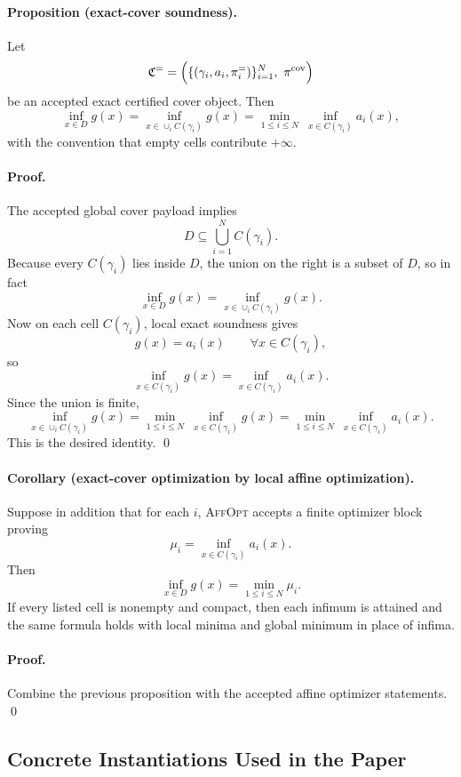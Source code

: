 \paragraph{Proposition (exact-cover soundness).}
Let
\[
\mathfrak C^{=}
=
\Bigl(\{(\gamma_i,a_i,\pi_i^{=})\}_{i=1}^N,\ \pi^{\mathrm{cov}}\Bigr)
\]
be an accepted exact certified cover object. Then
\[
\inf_{x\in D} g(x)
=
\inf_{x\in \cup_i C(\gamma_i)} g(x)
=
\min_{1\le i\le N}\ \inf_{x\in C(\gamma_i)} a_i(x),
\]
with the convention that empty cells contribute $+\infty$.

\paragraph{Proof.}
The accepted global cover payload implies
\[
D\subseteq \bigcup_{i=1}^N C(\gamma_i).
\]
Because every $C(\gamma_i)$ lies inside $D$, the union on the right is a subset of $D$, so in fact
\[
\inf_{x\in D} g(x)
=
\inf_{x\in \cup_i C(\gamma_i)} g(x).
\]
Now on each cell $C(\gamma_i)$, local exact soundness gives
\[
g(x)=a_i(x)
\qquad \forall x\in C(\gamma_i),
\]
so
\[
\inf_{x\in C(\gamma_i)} g(x)
=
\inf_{x\in C(\gamma_i)} a_i(x).
\]
Since the union is finite,
\[
\inf_{x\in \cup_i C(\gamma_i)} g(x)
=
\min_{1\le i\le N}\ \inf_{x\in C(\gamma_i)} g(x)
=
\min_{1\le i\le N}\ \inf_{x\in C(\gamma_i)} a_i(x).
\]
This is the desired identity. \qed

\paragraph{Corollary (exact-cover optimization by local affine optimization).}
Suppose in addition that for each $i$, \textsc{AffOpt} accepts a finite optimizer block proving
\[
\mu_i = \inf_{x\in C(\gamma_i)} a_i(x).
\]
Then
\[
\inf_{x\in D} g(x)=\min_{1\le i\le N}\mu_i.
\]
If every listed cell is nonempty and compact, then each infimum is attained and the same formula holds with local minima and global minimum in place of infima.

\paragraph{Proof.}
Combine the previous proposition with the accepted affine optimizer statements. \qed

\subsection{Concrete Instantiations Used in the Paper}

